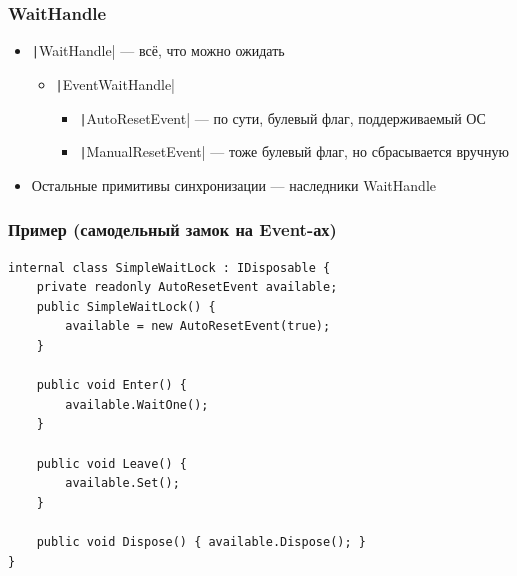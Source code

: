 \documentclass{../../slides-style}
\begin{document}
    \begin{frame}
        \frametitle{WaitHandle}
        \begin{itemize}
            \item \texttt|WaitHandle| --- всё, что можно ожидать
            \begin{itemize}
                \item \texttt|EventWaitHandle|
                \begin{itemize}
                    \item \texttt|AutoResetEvent| --- по сути, булевый флаг, поддерживаемый ОС
                    \item \texttt|ManualResetEvent| --- тоже булевый флаг, но сбрасывается вручную
                \end{itemize}
            \end{itemize}
            \item Остальные примитивы синхронизации --- наследники WaitHandle
        \end{itemize}
    \end{frame}

    \begin{frame}[fragile]
        \frametitle{Пример (самодельный замок на Event-ах)}
        \begin{small}
            \begin{verbatim}
internal class SimpleWaitLock : IDisposable {
    private readonly AutoResetEvent available;
    public SimpleWaitLock() {
        available = new AutoResetEvent(true); 
    }

    public void Enter() {
        available.WaitOne();
    }

    public void Leave() {
        available.Set();
    }

    public void Dispose() { available.Dispose(); }
}
            \end{verbatim}
        \end{small}
    \end{frame}
\end{document}
